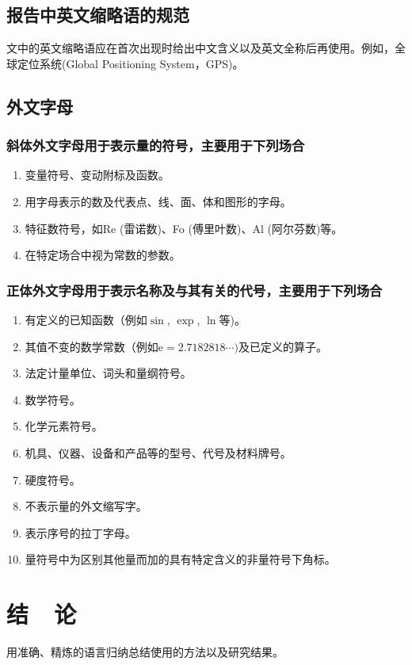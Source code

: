 \documentclass{thuemp}
\begin{document}
\subsection{报告中英文缩略语的规范}
文中的英文缩略语应在首次出现时给出中文含义以及英文全称后再使用。例如，全球定位系统(Global Positioning System，GPS)。


\subsection{外文字母}
\subsubsection{斜体外文字母用于表示量的符号，主要用于下列场合}

\begin{enumerate}
\renewcommand{\labelenumi}{(\theenumi)}
\item 变量符号、变动附标及函数。
\item 用字母表示的数及代表点、线、面、体和图形的字母。
\item 特征数符号，如Re (雷诺数)、Fo (傅里叶数)、Al (阿尔芬数)等。
\item 在特定场合中视为常数的参数。
\end{enumerate} 

\subsubsection{正体外文字母用于表示名称及与其有关的代号，主要用于下列场合}
\begin{enumerate}
\renewcommand{\labelenumi}{(\theenumi)}
\item 有定义的已知函数（例如$\sin$, $\exp$, $\ln$等)。
\item 其值不变的数学常数（例如$\mathrm{e} = 2.718 281 8\cdots)$及已定义的算子。
\item 法定计量单位、词头和量纲符号。
\item 数学符号。
\item 化学元素符号。
\item 机具、仪器、设备和产品等的型号、代号及材料牌号。
\item 硬度符号。
\item 不表示量的外文缩写字。
\item 表示序号的拉丁字母。
\item 量符号中为区别其他量而加的具有特定含义的非量符号下角标。
\end{enumerate} 

\section{结~~论}
用准确、精炼的语言归纳总结使用的方法以及研究结果。
\end{document}
